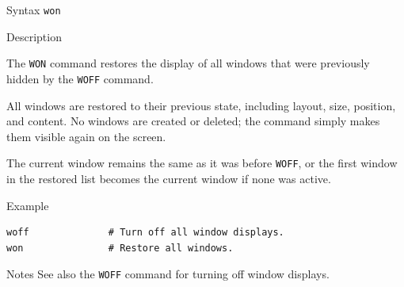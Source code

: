 %
%
\pagebreak
{}

\begin{iPageDescEntry}{Syntax}
\texttt{won} \\
\end{iPageDescEntry}

\begin{iPageDescEntry}{Description}

The \texttt{WON} command restores the display of all windows that were
previously hidden by the \texttt{WOFF} command.

All windows are restored to their previous state, including layout, size,
position, and content. No windows are created or deleted; the command simply
makes them visible again on the screen.

The current window remains the same as it was before \texttt{WOFF}, or the
first window in the restored list becomes the current window if none was active.

\end{iPageDescEntry}

\begin{iPageDescOpEntry}{Example}
\begin{lstlisting}[style=iPageOpStyle]
woff              # Turn off all window displays.
won               # Restore all windows.
\end{lstlisting}
\end{iPageDescOpEntry}

\begin{iPageDescEntry}{Notes}
See also the \texttt{WOFF} command for turning off window displays.
\end{iPageDescEntry}
